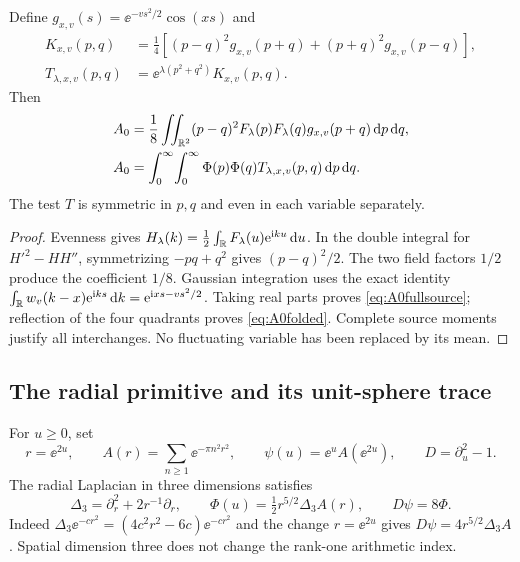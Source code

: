 \begin{proposition}\label{prop:A0source}
Define $g_{x,v}(s)=\ee^{-vs^2/2}\cos(xs)$ and
\begin{align}
 K_{x,v}(p,q)&=\frac14[(p-q)^2g_{x,v}(p+q)
                         +(p+q)^2g_{x,v}(p-q)],\label{eq:A0K}\\
 T_{\lambda,x,v}(p,q)&=\ee^{\lambda(p^2+q^2)}K_{x,v}(p,q).
 \label{eq:A0T}
\end{align}
Then
\begin{align}
 A_0&=\frac18\iint_{\mathbb R^2}(p-q)^2F_\lambda(p)F_\lambda(q)
       g_{x,v}(p+q)\,\mathrm d p\,\mathrm d q,\label{eq:A0fullsource}\\
 A_0&=\int_0^\infty\!\int_0^\infty
       \Phi(p)\Phi(q)T_{\lambda,x,v}(p,q)\,\mathrm d p\,\mathrm d q.
 \label{eq:A0folded}
\end{align}
The test $T$ is symmetric in $p,q$ and even in each variable separately.
\end{proposition}
\begin{proof}
Evenness gives $H_\lambda(k)=\tfrac12\int_\mathbb R F_\lambda(u)\mathrm e^{\mathrm i ku}\,\mathrm d u$.
In the double integral for $H'^2-HH''$, symmetrizing $-pq+q^2$ gives
$(p-q)^2/2$. The two field factors $1/2$ produce the coefficient $1/8$.
Gaussian integration uses the exact identity
$\int_\mathbb R w_v(k-x)\mathrm e^{\mathrm i ks}\,\mathrm d k=\mathrm e^{\mathrm i xs-vs^2/2}$.
Taking real parts proves \eqref{eq:A0fullsource}; reflection of the four
quadrants proves \eqref{eq:A0folded}. Complete source moments justify all
interchanges. No fluctuating variable has been replaced by its mean.
\end{proof}

\subsection{The radial primitive and its unit-sphere trace}
For $u\ge0$, set
\begin{equation}\label{eq:radialprimitive}
 r=\ee^{2u},\qquad A(r)=\sum_{n\ge1}\ee^{-\pi n^2r^2},\qquad
 \psi(u)=\ee^u A(\ee^{2u}),\qquad D=\partial_u^2-1.
\end{equation}
The radial Laplacian in three dimensions satisfies
\begin{equation}\label{eq:radialsource}
 \Delta_3=\partial_r^2+2r^{-1}\partial_r,\qquad
 \Phi(u)=\tfrac12r^{5/2}\Delta_3A(r),\qquad D\psi=8\Phi.
\end{equation}
Indeed $\Delta_3\ee^{-cr^2}=(4c^2r^2-6c)\ee^{-cr^2}$ and the
change $r=\ee^{2u}$ gives $D\psi=4r^{5/2}\Delta_3A$.
Spatial dimension three does not change the rank-one arithmetic index.

